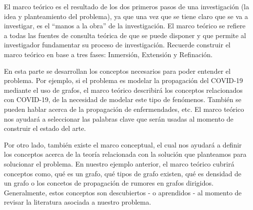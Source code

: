 El marco teórico es el resultado de los dos primeros pasos de una investigación (la idea y planteamiento del problema), ya que una vez que se tiene claro que se va a investigar, es el “manos a la obra” de la investigación.
El marco teórico se refiere a todas las fuentes de consulta teórica de que se puede disponer y que permite al investigador fundamentar su proceso de investigación.
Recuerde construir el marco teórico en base a tres fases: Inmersión, Extensión y Refinación. \\

\begin{tcolorbox}[colback=blue!5!white,colframe=blue!75!black,title=Ejemplo]
En esta parte se desarrollan los conceptos necesarios para poder entender el problema. Por ejemplo, si el problema es modelar la propagación del COVID-19 mediante el uso de grafos, el marco teórico describirá los conceptos relacionados con COVID-19, de la necesidad de modelar este tipo de fenómenos. También se pueden hablar acerca de la propagación de enfermendades, etc. El marco teórico nos ayudará a seleccionar las palabras clave que serán usadas al momento de construir el estado del arte.

Por otro lado, también existe el marco conceptual, el cual nos ayudará a definir los conceptos acerca de la teoría relacionada con la solución que planteamos para solucionar el problema. En nuestro ejemplo anterior, el marco teórico cubrirá conceptos como, qué es un grafo, qué tipos de grafo existen, qué es densidad de un grafo o los concetos de propagación de rumores en grafos dirigidos. Generalmente, estos conceptos son descubiertos - o aprendidos - al momento de revisar la literatura asociada a nuestro problema.
\end{tcolorbox}
